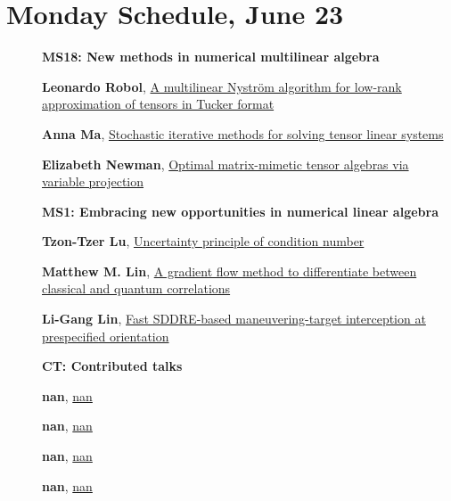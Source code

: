 \documentclass[ILAS2025-program.tex]{subfiles}
\begin{document}
\section*{Monday Schedule, June 23 }
        
        \begin{description}
    \item[] {\color{mstitle}\textbf{MS18: New methods in numerical multilinear algebra}} 
    \item[] \hypertarget{up0037}{}\textbf{Leonardo Robol}, \hyperlink{down0037}{A multilinear Nyström algorithm for low-rank approximation of tensors in Tucker format}
        \item[] \hypertarget{up0038}{}\textbf{Anna Ma}, \hyperlink{down0038}{Stochastic iterative methods for solving tensor linear systems}
        \item[] \hypertarget{up0039}{}\textbf{Elizabeth Newman}, \hyperlink{down0039}{Optimal matrix-mimetic tensor algebras via variable projection
}
        \end{description}
    \begin{description}
    \item[] {\color{mstitle}\textbf{MS1: Embracing new opportunities in numerical linear algebra}} 
    \item[] \hypertarget{up0070}{}\textbf{Tzon-Tzer Lu}, \hyperlink{down0070}{Uncertainty principle of condition number}
        \item[] \hypertarget{up0071}{}\textbf{Matthew M. Lin}, \hyperlink{down0071}{A gradient flow method to differentiate between classical and quantum correlations
}
        \item[] \hypertarget{up0072}{}\textbf{Li-Gang Lin}, \hyperlink{down0072}{Fast SDDRE-based maneuvering-target interception at prespecified orientation}
        \end{description}
    \begin{description}
    \item[] {\color{mstitle}\textbf{CT: Contributed talks}} 
    \item[] \hypertarget{up0112}{}\textbf{nan}, \hyperlink{down0112}{nan}
        \item[] \hypertarget{up0113}{}\textbf{nan}, \hyperlink{down0113}{nan}
        \item[] \hypertarget{up0114}{}\textbf{nan}, \hyperlink{down0114}{nan}
        \item[] \hypertarget{up0115}{}\textbf{nan}, \hyperlink{down0115}{nan}
        \end{description}
    \newpage
\end{document}
